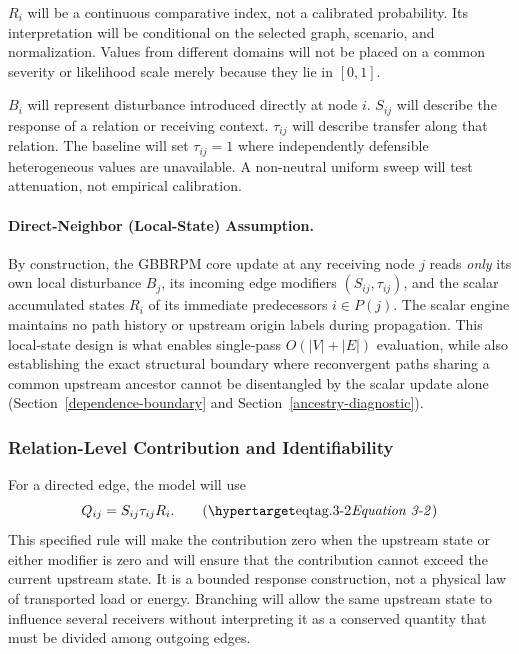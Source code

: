 $R_i$ will be a continuous comparative index, not a calibrated probability.
Its interpretation will be conditional on the selected graph, scenario, and
normalization. Values from different domains will not be placed on a common
severity or likelihood scale merely because they lie in $[0,1]$.

$B_i$ will represent disturbance introduced directly at node $i$.
$S_{ij}$ will describe the response of a relation or receiving context.
$\tau_{ij}$ will describe transfer along that relation. The baseline will set
$\tau_{ij}=1$ where independently defensible heterogeneous values are unavailable.
A non-neutral uniform sweep will test attenuation, not empirical calibration.

\paragraph{Direct-Neighbor (Local-State) Assumption.}
By construction, the GBBRPM core update at any receiving node $j$ reads
\emph{only} its own local disturbance $B_j$, its incoming edge modifiers
$(S_{ij},\tau_{ij})$, and the scalar accumulated states $R_i$ of its immediate
predecessors $i\in P(j)$. The scalar engine maintains no path history or
upstream origin labels during propagation. This local-state design is what
enables single-pass $O(|V|+|E|)$ evaluation, while also establishing the exact
structural boundary where reconvergent paths sharing a common upstream ancestor
cannot be disentangled by the scalar update alone
(Section~\ref{dependence-boundary} and Section~\ref{ancestry-diagnostic}).

\subsubsection{Relation-Level Contribution and Identifiability}

For a directed edge, the model will use
\[
Q_{ij}=S_{ij}\tau_{ij}R_i.
\eqtag{3-2}
\]
This specified rule will make the contribution zero when the upstream state
or either modifier is zero and will ensure that the contribution cannot exceed
the current upstream state. It is a bounded response construction, not
a physical law of transported load or energy. Branching will allow the same
upstream state to influence several receivers without interpreting it as a
conserved quantity that must be divided among outgoing edges.

